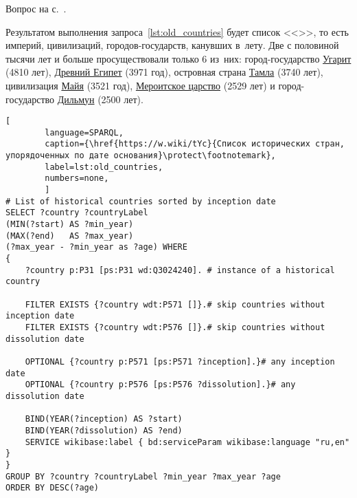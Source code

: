 \begin{task}
	\label{answer:old_countries}
	\AnswerBackref Вопрос на с.~\pageref{lst:List_of_historical_countries}.

Результатом выполнения запроса~\ref{lst:old_countries} будет список 
    <<>>, то есть 
    империй, цивилизаций, городов-государств, канувших в~лету. 
    Две с половиной тысячи лет и больше просуществовали только 6 из~них: 
    город-государство \href{https://ru.wikipedia.org/?curid=784331}{Угарит} (4810 лет), 
                      \href{https://w.wiki/vAX}{Древний Египет} (3971 год), 
    островная страна  \href{https://ru.wikipedia.org/?curid=7673518}{Тамла} (3740 лет), 
    цивилизация \href{https://ru.wikipedia.org/?curid=99928}{Майя} (3521 год), 
    \href{https://ru.wikipedia.org/?curid=707253}{Мероитское царство} (2529 лет) 
    и город-государство \href{https://ru.wikipedia.org/?curid=230984}{Дильмун} (2500 лет).


\newpage
{}
\begin{lstlisting}[ 
        language=SPARQL, 
	    caption={\href{https://w.wiki/tYc}{Список исторических стран, упорядоченных по дате основания}\protect\footnotemark},
	    label=lst:old_countries,
        numbers=none,
        ]
# List of historical countries sorted by inception date
SELECT ?country ?countryLabel 
(MIN(?start) AS ?min_year)
(MAX(?end)   AS ?max_year) 
(?max_year - ?min_year as ?age) WHERE
{
    ?country p:P31 [ps:P31 wd:Q3024240]. # instance of a historical country
	
    FILTER EXISTS {?country wdt:P571 []}.# skip countries without inception date
    FILTER EXISTS {?country wdt:P576 []}.# skip countries without dissolution date
	
    OPTIONAL {?country p:P571 [ps:P571 ?inception].}# any inception date
    OPTIONAL {?country p:P576 [ps:P576 ?dissolution].}# any dissolution date
	
    BIND(YEAR(?inception) AS ?start)
    BIND(YEAR(?dissolution) AS ?end)  
    SERVICE wikibase:label { bd:serviceParam wikibase:language "ru,en" }
}
GROUP BY ?country ?countryLabel ?min_year ?max_year ?age
ORDER BY DESC(?age)
\end{lstlisting}
\end{task}


